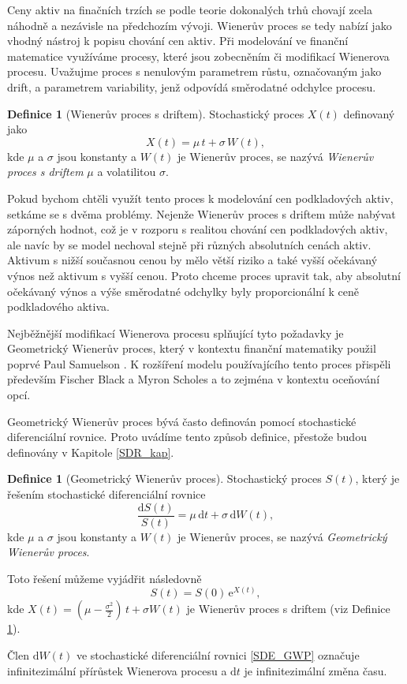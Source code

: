 \documentclass[a4paper,12pt]{report}
\theoremstyle{definition} \newtheorem{definice}[veta]{Definice}
\theoremstyle{remark}
\begin{document}
Ceny aktiv na finačních trzích se podle teorie dokonalých trhů chovají zcela náhodně a nezávisle na předchozím vývoji.
Wienerův proces se tedy nabízí jako vhodný nástroj k popisu chování cen aktiv.
Při modelování ve finanční matematice využíváme procesy, které jsou zobecněním či modifikací Wienerova procesu. 
Uvažujme proces s nenulovým parametrem růstu, označovaným jako drift, a parametrem variability, jenž odpovídá směrodatné odchylce procesu.
\begin{definice}[Wienerův proces s driftem]\label{Wieneruv_proces_s_driftem}
Stochastický proces $X(t)$ definovaný jako
$$X(t)  = \mu\, t + \sigma\, W (t),$$
kde $\mu$ a $\sigma$ jsou konstanty a $W (t)$ je Wienerův proces,
se nazývá \textit{Wienerův proces  s driftem} $\mu$ a volatilitou $\sigma$.
\end{definice}
Pokud bychom chtěli využít tento proces k modelování cen podkladových aktiv, setkáme se s dvěma problémy.
Nejenže Wienerův proces s driftem může nabývat záporných hodnot, což je v rozporu s realitou chování cen podkladových aktiv, ale navíc by se model nechoval stejně při různých absolutních cenách aktiv. 
Aktivum s nižší současnou cenou by mělo větší riziko a také vyšší očekávaný výnos než aktivum s vyšší cenou.
Proto chceme proces upravit tak, aby absolutní očekávaný výnos a výše směrodatné odchylky byly proporcionální k ceně podkladového aktiva. 

Nejběžnější modifikací Wienerova procesu splňující tyto požadavky je Geometrický Wienerův proces, který v kontextu finanční matematiky použil poprvé Paul Samuelson \cite{samuelson1964rational}.
K rozšíření modelu používajícího tento proces přispěli především Fischer Black a Myron Scholes \cite{black1973pricing} a to zejména v kontextu oceňování opcí.

Geometrický Wienerův proces bývá často definován pomocí  stochastické diferenciální rovnice.
Proto uvádíme tento způsob definice, přestože budou definovány v Kapitole \ref{SDR_kap}.
\begin{definice}[Geometrický Wienerův proces]\label{Geometricky_Wieneruv_proces}
Stochastický proces $S(t)$, který je řešením stochastické diferenciální rovnice 
\begin{equation}\label{SDE_GWP}
\frac{\mathrm{d} S(t)}{S(t)} = \mu\,\mathrm{d}t + \sigma\,\mathrm{d}W (t), 
\end{equation}
kde  $\mu$ a $\sigma$ jsou konstanty a $W (t)$ je Wienerův proces,
se nazývá \textit{Geometrický Wienerův proces}.

Toto řešení můžeme vyjádřit následovně
\begin{equation}\label{GWP}
S(t) = S(0)\,\mathrm{e}^{X(t)},
\end{equation}
kde $X(t) = (\mu - \frac{\sigma^2}{2})\,t + \sigma W (t)$ je Wienerův proces s driftem (viz Definice \ref{Wieneruv_proces_s_driftem}).
\end{definice}
Člen $\mathrm{d}W(t)$ ve stochastické diferenciální rovnici \eqref{SDE_GWP} označuje infinitezimální přírůstek Wienerova procesu a $\mathrm{d}t$ je infinitezimální změna času.
\end{document}
